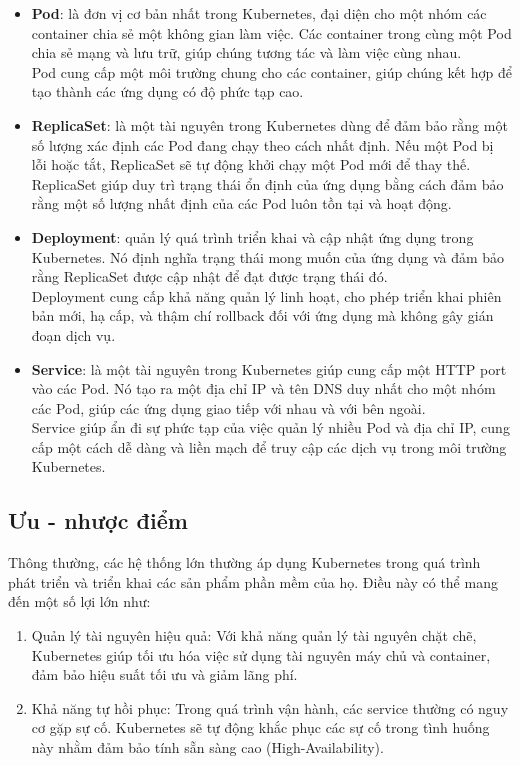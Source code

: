 \begin{itemize}
    \item \textbf{Pod}: là đơn vị cơ bản nhất trong Kubernetes, đại diện cho một nhóm các container chia sẻ một không gian làm việc. Các container trong cùng một Pod chia sẻ mạng và lưu trữ, giúp chúng tương tác và làm việc cùng nhau. \\
    Pod cung cấp một môi trường chung cho các container, giúp chúng kết hợp để tạo thành các ứng dụng có độ phức tạp cao.

    \item \textbf{ReplicaSet}: là một tài nguyên trong Kubernetes dùng để đảm bảo rằng một số lượng xác định các Pod đang chạy theo cách nhất định. Nếu một Pod bị lỗi hoặc tắt, ReplicaSet sẽ tự động khởi chạy một Pod mới để thay thế. \\
    ReplicaSet giúp duy trì trạng thái ổn định của ứng dụng bằng cách đảm bảo rằng một số lượng nhất định của các Pod luôn tồn tại và hoạt động.

    \item \textbf{Deployment}: quản lý quá trình triển khai và cập nhật ứng dụng trong Kubernetes. Nó định nghĩa trạng thái mong muốn của ứng dụng và đảm bảo rằng ReplicaSet được cập nhật để đạt được trạng thái đó. \\
    Deployment cung cấp khả năng quản lý linh hoạt, cho phép triển khai phiên bản mới, hạ cấp, và thậm chí rollback đối với ứng dụng mà không gây gián đoạn dịch vụ.

    \item \textbf{Service}: là một tài nguyên trong Kubernetes giúp cung cấp một HTTP port vào các Pod. Nó tạo ra một địa chỉ IP và tên DNS duy nhất cho một nhóm các Pod, giúp các ứng dụng giao tiếp với nhau và với bên ngoài. \\
    Service giúp ẩn đi sự phức tạp của việc quản lý nhiều Pod và địa chỉ IP, cung cấp một cách dễ dàng và liền mạch để truy cập các dịch vụ trong môi trường Kubernetes.
\end{itemize}

\subsection{Ưu - nhược điểm}
Thông thường, các hệ thống lớn thường áp dụng Kubernetes trong quá trình phát triển và triển khai các sản phẩm phần mềm của họ. Điều này có thể mang đến một số lợi lớn như:
\begin{enumerate}
    \item Quản lý tài nguyên hiệu quả: Với khả năng quản lý tài nguyên chặt chẽ, Kubernetes giúp tối ưu hóa việc sử dụng tài nguyên máy chủ và container, đảm bảo hiệu suất tối ưu và giảm lãng phí.
    \item Khả năng tự hồi phục: Trong quá trình vận hành, các service thường có nguy cơ gặp sự cố. Kubernetes sẽ tự động khắc phục các sự cố trong tình huống này nhằm đảm bảo tính sẵn sàng cao (High-Availability).
\end{enumerate}


